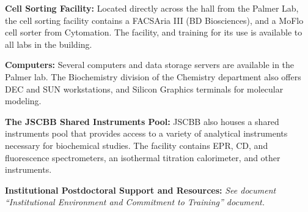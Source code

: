   {\bf Cell Sorting Facility:} Located directly across the hall from the Palmer Lab, the cell sorting facility contains a FACSAria III (BD Biosciences), and a MoFlo cell sorter from Cytomation. The facility, and training for its use is available to all labs in the building.

  {\bf Computers:} Several computers and data storage servers are available in the Palmer lab. The Biochemistry division of the Chemistry department also offers DEC and SUN workstations, and Silicon Graphics terminals for molecular modeling.

  {\bf The JSCBB Shared Instruments Pool:} JSCBB also houses a shared instruments pool that provides access to a variety of analytical instruments necessary for biochemical studies. The facility contains EPR, CD, and fluorescence spectrometers, an isothermal titration calorimeter, and other instruments.

  {\bf Institutional Postdoctoral Support and Resources:} \textit{See document ``Institutional Environment and Commitment to Training'' document.}

